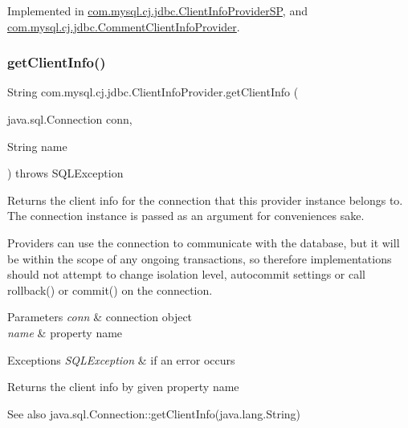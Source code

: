 Implemented in \mbox{\hyperlink{classcom_1_1mysql_1_1cj_1_1jdbc_1_1_client_info_provider_s_p_a27dcf12911f0de535b6653135bf10e9e}{com.\+mysql.\+cj.\+jdbc.\+Client\+Info\+Provider\+SP}}, and \mbox{\hyperlink{classcom_1_1mysql_1_1cj_1_1jdbc_1_1_comment_client_info_provider_a6e6267820c12e2f4180b01e3053c9c64}{com.\+mysql.\+cj.\+jdbc.\+Comment\+Client\+Info\+Provider}}.

\mbox{\label{interfacecom_1_1mysql_1_1cj_1_1jdbc_1_1_client_info_provider_a0447982e2a9eeec5776288384f7db3c1}} 
\subsubsection{\texorpdfstring{get\+Client\+Info()}{getClientInfo()}\hspace{0.1cm}{\footnotesize\ttfamily [2/2]}}
{\footnotesize\ttfamily String com.\+mysql.\+cj.\+jdbc.\+Client\+Info\+Provider.\+get\+Client\+Info (\begin{DoxyParamCaption}\item[{java.\+sql.\+Connection}]{conn,  }\item[{String}]{name }\end{DoxyParamCaption}) throws S\+Q\+L\+Exception}

Returns the client info for the connection that this provider instance belongs to. The connection instance is passed as an argument for convenience\textquotesingle{}s sake.

Providers can use the connection to communicate with the database, but it will be within the scope of any ongoing transactions, so therefore implementations should not attempt to change isolation level, autocommit settings or call rollback() or commit() on the connection.


\begin{DoxyParams}{Parameters}
{\em conn} & connection object \\
\hline
{\em name} & property name \\
\hline
\end{DoxyParams}

\begin{DoxyExceptions}{Exceptions}
{\em S\+Q\+L\+Exception} & if an error occurs \\
\hline
\end{DoxyExceptions}
\begin{DoxyReturn}{Returns}
the client info by given property name 
\end{DoxyReturn}
\begin{DoxySeeAlso}{See also}
java.\+sql.\+Connection\+::get\+Client\+Info(java.\+lang.\+String) 
\end{DoxySeeAlso}


